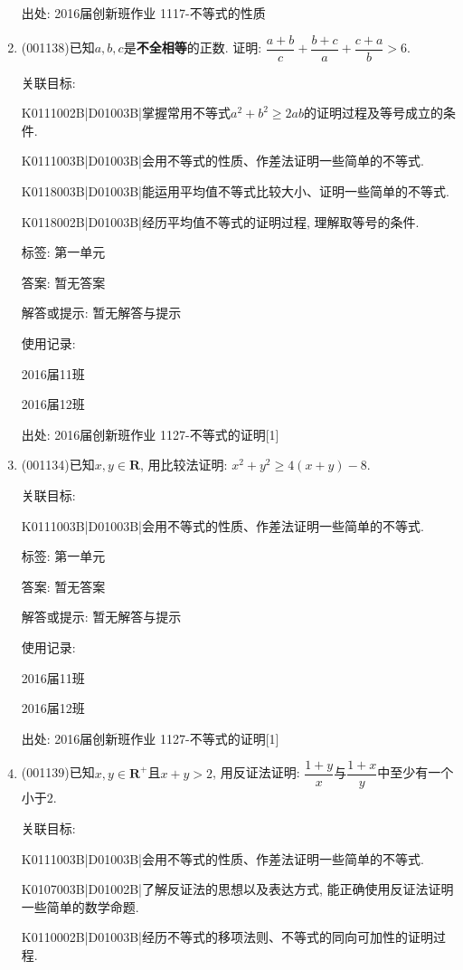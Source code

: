 \documentclass[10pt,a4paper]{article}
\begin{document}
\begin{enumerate}[1.]
出处: 2016届创新班作业	1117-不等式的性质
\item { (001138)}已知$a,b,c$是{\bf 不全相等}的正数. 证明: $\dfrac{a+b}{c}+\dfrac{b+c}{a}+\dfrac{c+a}{b}>6$.


关联目标:

K0111002B|D01003B|掌握常用不等式$a^2+b^2 \ge 2ab$的证明过程及等号成立的条件.

K0111003B|D01003B|会用不等式的性质、作差法证明一些简单的不等式.

K0118003B|D01003B|能运用平均值不等式比较大小、证明一些简单的不等式.

K0118002B|D01003B|经历平均值不等式的证明过程, 理解取等号的条件.



标签: 第一单元

答案: 暂无答案

解答或提示: 暂无解答与提示

使用记录:

2016届11班	

2016届12班	


出处: 2016届创新班作业	1127-不等式的证明[1]
\item { (001134)}已知$x,y \in \mathbf{R}$, 用比较法证明: $x^2+y^2\ge 4(x+y)-8$.


关联目标:

K0111003B|D01003B|会用不等式的性质、作差法证明一些简单的不等式.



标签: 第一单元

答案: 暂无答案

解答或提示: 暂无解答与提示

使用记录:

2016届11班	

2016届12班	


出处: 2016届创新班作业	1127-不等式的证明[1]
\item { (001139)}已知$x,y\in \mathbf{R}^+$且$x+y>2$, 用反证法证明: $\dfrac{1+y}{x}$与$\dfrac{1+x}{y}$中至少有一个小于$2$.


关联目标:

K0111003B|D01003B|会用不等式的性质、作差法证明一些简单的不等式.

K0107003B|D01002B|了解反证法的思想以及表达方式, 能正确使用反证法证明一些简单的数学命题.

K0110002B|D01003B|经历不等式的移项法则、不等式的同向可加性的证明过程.




\end{enumerate}
\end{document}
